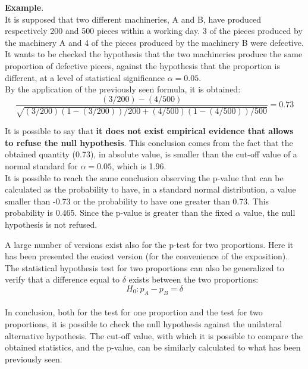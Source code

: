 \begin{frame}
  \vspace{0.25cm}
  \textbf{Example}.\\
  It is supposed that two different machineries, A and B, have produced respectively 200 and 500 pieces within a working day. 3 of the pieces produced by the machinery A and 4 of the pieces produced by the machinery B were defective.\\
  \vspace{0.25cm}
  It wants to be checked the hypothesis that the two machineries produce the same proportion of defective pieces, against the hypothesis that the proportion is different, at a level of statistical significance  $ \alpha = 0.05 $.\\
  \vspace{0.25cm}
  By the application of the previously seen formula, it is obtained:
  $$ \frac{(3/200) - (4/500)}{\sqrt{(3/200) (1 - (3/200)) / 200 + (4/500) (1 - (4/500)) / 500}} = 0.73 $$
\end{frame}

\begin{frame}
  \vspace{0.25cm}
  It is possible to say that \textbf{it does not exist empirical evidence that allows to refuse the null hypothesis}. This conclusion comes from the fact that the obtained quantity (0.73), in absolute value, is smaller than the cut-off value of a normal standard for $ \alpha = 0.05 $, which is 1.96.\\
  \vspace{0.5cm}
  It is possible to reach the same conclusion observing the p-value that can be calculated as the probability to have, in a standard normal distribution, a value smaller than -0.73 or the probability to have one greater than 0.73. This probability is 0.465. Since the p-value is greater than the fixed $ \alpha $ value, the null hypothesis is not refused.
\end{frame}

\begin{frame}
  \vspace{0.25cm}
  A large number of versions exist also for the p-test for two proportions. Here it has been presented the easiest version (for the convenience of the exposition).\\
  \vspace{0.5cm}
  The statistical hypothesis test for two proportions can also be generalized to verify that a difference equal to $ \delta $ exists between the two proportions:
  $$ H_0: p_A - p_B = \delta $$\\
  \vspace{0.25cm}
  In conclusion, both for the test for one proportion and the test for two proportions, it is possible to check the null hypothesis against the unilateral alternative hypothesis. The cut-off value, with which it is possible to compare the obtained statistics, and the p-value, can be similarly calculated to what has been previously seen.
\end{frame}

